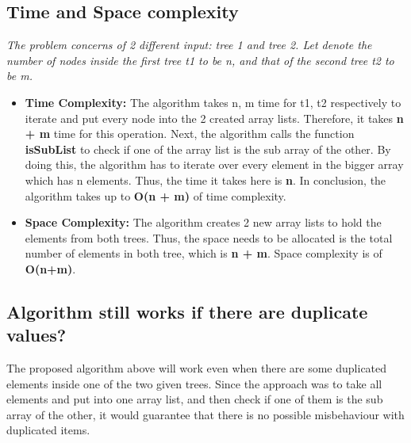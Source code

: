 \subsection{Time and Space complexity}
\textit{The problem concerns of 2 different input: tree 1 and tree 2. Let denote the number of nodes inside the first tree t1 to be n, and that of the second tree t2 to be m.}
\begin{itemize}
    \item \textbf{Time Complexity:} The algorithm takes n, m time for t1, t2 respectively to iterate and put every node into the 2 created array lists. Therefore, it takes \textbf{n + m} time for this operation. Next, the algorithm calls the function \textbf{isSubList} to check if one of the array list is the sub array of the other. By doing this, the algorithm has to iterate over every element in the bigger array which has n elements. Thus, the time it takes here is \textbf{n}. In conclusion, the algorithm takes up to \textbf{O(n + m)} of time complexity.
    \item \textbf{Space Complexity:} The algorithm creates 2 new array lists to hold the elements from both trees. Thus, the space needs to be allocated is the total number of elements in both tree, which is  \textbf{n + m}. Space complexity is of \textbf{O(n+m)}.
\end{itemize}

\subsection{Algorithm still works if there are duplicate values?}
The proposed algorithm above will work even when there are some duplicated elements inside one of the two given trees. Since the approach was to take all elements and put into one array list, and then check if one of them is the sub array of the other, it would guarantee that there is no possible misbehaviour with duplicated items.


